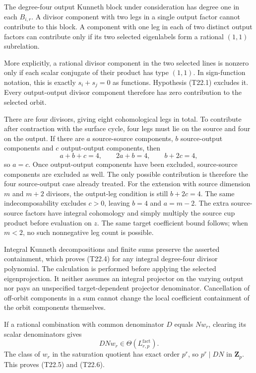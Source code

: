 \documentclass[11pt,a4paper]{article}
\theoremstyle{definition}
\begin{document}
The degree-four output Kunneth block under consideration has degree one in each \(B_{i,r}\). A divisor component with two legs in a single output factor cannot contribute to this block. A component with one leg in each of two distinct output factors can contribute only if its two selected eigenlabels form a rational \((1,1)\) subrelation.

More explicitly, a rational divisor component in the two selected lines is nonzero only if each scalar conjugate of their product has type \((1,1)\). In sign-function notation, this is exactly \(s_i+s_j=0\) as functions. Hypothesis (T22.1) excludes it. Every output-output divisor component therefore has zero contribution to the selected orbit.

There are four divisors, giving eight cohomological legs in total. To contribute after contraction with the surface cycle, four legs must lie on the source and four on the output. If there are \(a\) source-source components, \(b\) source-output components and \(c\) output-output components, then \[
 a+b+c=4,\qquad 2a+b=4,\qquad b+2c=4,
\] so \(a=c\). Once output-output components have been excluded, source-source components are excluded as well. The only possible contribution is therefore the four source-output case already treated. For the extension with source dimension \(m\) and \(m+2\) divisors, the output-leg condition is still \(b+2c=4\). The same indecomposability excludes \(c>0\), leaving \(b=4\) and \(a=m-2\). The extra source-source factors have integral cohomology and simply multiply the source cup product before evaluation on \(z\). The same target coefficient bound follows; when \(m<2\), no such nonnegative leg count is possible.

Integral Kunneth decompositions and finite sums preserve the asserted containment, which proves (T22.4) for any integral degree-four divisor polynomial. The calculation is performed before applying the selected eigenprojection. It neither assumes an integral projector on the varying output nor pays an unspecified target-dependent projector denominator. Cancellation of off-orbit components in a sum cannot change the local coefficient containment of the orbit components themselves.

If a rational combination with common denominator \(D\) equals \(Nw_r\), clearing its scalar denominators gives \[
 DNw_r\in\Theta(L^{\mathrm{fact}}_{r,p}).
\] The class of \(w_r\) in the saturation quotient has exact order \(p^r\), so \(p^r\mid DN\) in \(\mathbf Z_p\). This proves (T22.5) and (T22.6).
\end{document}
